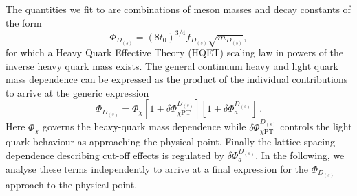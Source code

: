 The quantities we fit to are combinations of meson masses and decay constants of the form
\begin{equation}
  \Phi_{D_{(s)}} = (8t_0)^{3/4}f_{D_{(s)}} \sqrt{m_{D_{(s)}}},
  \label{eq:defphiD}
\end{equation}
for which a Heavy Quark Effective Theory (HQET) scaling law in powers of the inverse
heavy quark mass exists.
The general continuum heavy and light quark mass dependence can be expressed as the product of the individual contributions to arrive at the generic expression 
\begin{equation}
	\Phi_{D_{(s)}} = \Phi_{\chi} \left[
	1 + \delta\Phi_{\chi\mathrm{PT}}^{D_{(s)}}
	\right]
	\left[
	1 + \delta\Phi_a^{D_{(s)}}
	\right]\,.
	\label{eq:fds_different_pieces}
\end{equation}
Here $\Phi_\chi$ governs the heavy-quark mass dependence while  $\delta\Phi_{\chi\mathrm{PT}}^{D_{(s)}}$ controls the light quark behaviour as approaching the physical point. Finally the lattice spacing dependence describing cut-off effects is regulated by $\delta\Phi_a^{D_{(s)}}$. In the following, we analyse these terms independently to arrive at a final expression for the $\Phi_{D_{(s)}}$ approach to the physical point.

